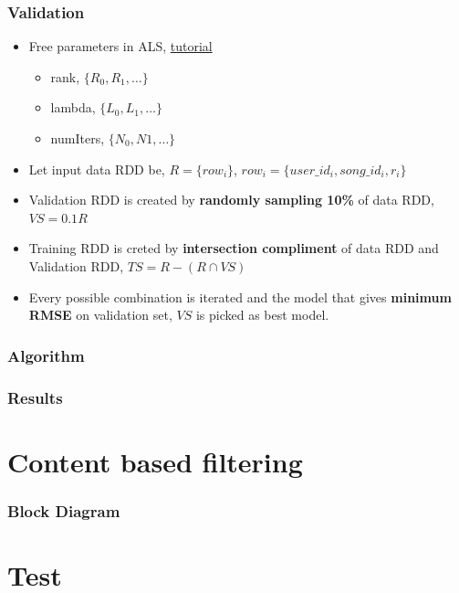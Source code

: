 \documentclass[11pt]{beamer}
\begin{document}
	\begin{frame}
		\frametitle{Validation}
		\begin{itemize}
			\item Free parameters in ALS, \href{'http://spark.apache.org/docs/latest/mllib-collaborative-filtering.html'}{tutorial}
				\begin{itemize}
					\item rank, $\{R_0,R_1,\dots\}$
					\item lambda, $\{L_0,L_1,\dots\}$
					\item numIters, $\{N_0,N1,\dots\}$
				\end{itemize}
			\item Let input data RDD be, $R = \{row_i\}$, $row_i = \{user\_id_i, song\_id_i, r_i\}$
			\item Validation RDD is created by {\bf randomly sampling 10\%} of data RDD, $VS = 0.1R$
			\item Training RDD is creted by {\bf intersection compliment} of data RDD and Validation RDD,
			$TS = R - (R \cap VS)$
			\item Every possible combination is iterated and the model that gives {\bf minimum RMSE} on
			validation set, $VS$ is picked as best model.
		\end{itemize}
	\end{frame}
	\begin{frame}
		\frametitle{Algorithm}
	\end{frame}
	\begin{frame}
		\frametitle{Results}
	\end{frame}
	\section{Content based filtering}
	\begin{frame}
		\frametitle{Block Diagram}
	\end{frame}

	\section{Test}
\end{document}
